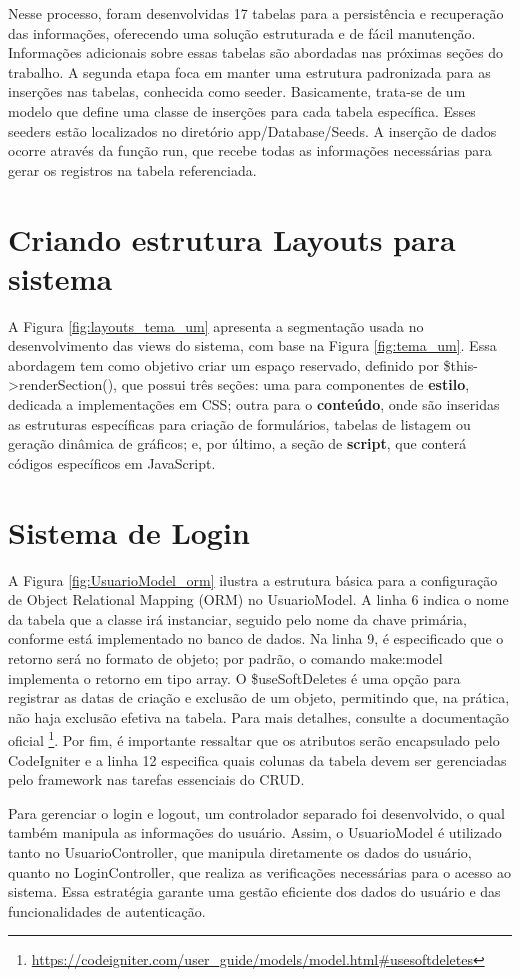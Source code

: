  Nesse processo, foram desenvolvidas 17 tabelas para a persistência e recuperação das informações, oferecendo uma solução estruturada e de fácil manutenção. Informações adicionais sobre essas tabelas são abordadas nas próximas seções do trabalho. A segunda etapa foca em manter uma estrutura padronizada para as inserções nas tabelas, conhecida como seeder. Basicamente, trata-se de um modelo que define uma classe de inserções para cada tabela específica. Esses seeders estão localizados no diretório app/Database/Seeds. A inserção de dados ocorre através da função run, que recebe todas as informações necessárias para gerar os registros na tabela referenciada.


\section{Criando estrutura Layouts para sistema}
\label{sec:layouts}
A Figura \ref{fig:layouts_tema_um} apresenta a segmentação usada no desenvolvimento das views do sistema, com base na Figura \ref{fig:tema_um}. Essa abordagem tem como objetivo criar um espaço reservado, definido por \$this->renderSection(), que possui três seções: uma para componentes de \textbf{estilo}, dedicada a implementações em CSS; outra para o \textbf{conteúdo}, onde são inseridas as estruturas específicas para criação de formulários, tabelas de listagem ou geração dinâmica de gráficos; e, por último, a seção de \textbf{script}, que conterá códigos específicos em JavaScript.
\section{Sistema de Login}
\label{sec:login}
A Figura \ref{fig:UsuarioModel_orm} ilustra a estrutura básica para a configuração de Object Relational Mapping (ORM) no UsuarioModel. A linha 6 indica o nome da tabela que a classe irá instanciar, seguido pelo nome da chave primária, conforme está implementado no banco de dados. Na linha 9, é especificado que o retorno será no formato de objeto; por padrão, o comando make:model implementa o retorno em tipo array. O \$useSoftDeletes é uma opção para registrar as datas de criação e exclusão de um objeto, permitindo que, na prática, não haja exclusão efetiva na tabela. Para mais detalhes, consulte a documentação oficial \cite{m:codeigniter4.5.4}\footnote{\url{https://codeigniter.com/user_guide/models/model.html#usesoftdeletes}}. Por fim, é importante ressaltar que os atributos serão encapsulado pelo CodeIgniter e a linha 12 especifica quais colunas da tabela devem ser gerenciadas pelo framework nas tarefas essenciais do CRUD.

Para gerenciar o login e logout, um controlador separado foi desenvolvido, o qual também manipula as informações do usuário. Assim, o UsuarioModel é utilizado tanto no UsuarioController, que manipula diretamente os dados do usuário, quanto no LoginController, que realiza as verificações necessárias para o acesso ao sistema. Essa estratégia garante uma gestão eficiente dos dados do usuário e das funcionalidades de autenticação.

